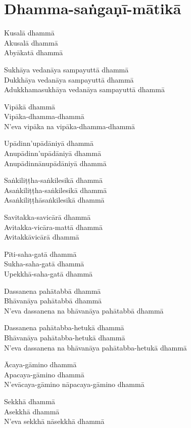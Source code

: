 \chapter{Dhamma-saṅgaṇī-mātikā}


\begin{paritta}
Kusalā dhammā\\
Akusalā dhammā\\
Abyākatā dhammā

Sukhāya vedanāya sampayuttā dhammā\\
Dukkhāya vedanāya sampayuttā dhammā\\
Adukkhamasukhāya vedanāya sampayuttā dhammā

Vipākā dhammā\\
Vipāka-dhamma-dhammā\\
N'eva vipāka na vipāka-dhamma-dhammā

Upādinn'upādāniyā dhammā\\
Anupādinn'upādāniyā dhammā\\
Anupādinnānupādāniyā dhammā

Saṅkiliṭṭha-saṅkilesikā dhammā\\
Asaṅkiliṭṭha-saṅkilesikā dhammā\\
Asaṅkiliṭṭhāsaṅkilesikā dhammā

Savitakka-savicārā dhammā\\
Avitakka-vicāra-mattā dhammā\\
Avitakkāvicārā dhammā

Pīti-saha-gatā dhammā\\
Sukha-saha-gatā dhammā\\
Upekkhā-saha-gatā dhammā

\enlargethispage{\baselineskip}

Dassanena pahātabbā dhammā\\
Bhāvanāya pahātabbā dhammā\\
N'eva dassanena na bhāvanāya pahātabbā dhammā

\clearpage

Dassanena pahātabba-hetukā dhammā\\
Bhāvanāya pahātabba-hetukā dhammā\\
N'eva dassanena na bhāvanāya pahātabba-hetukā dhammā

Ācaya-gāmino dhammā\\
Apacaya-gāmino dhammā\\
N'evācaya-gāmino nāpacaya-gāmino dhammā

Sekkhā dhammā\\
Asekkhā dhammā\\
N'eva sekkhā nāsekkhā dhammā


\end{paritta}
